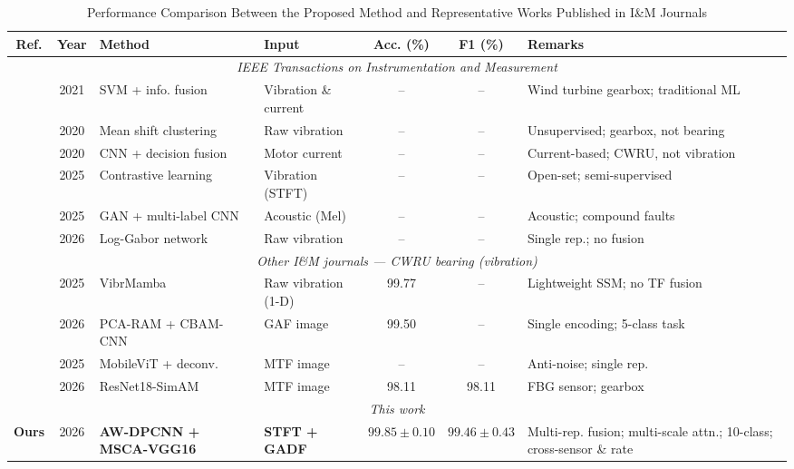 \begin{table}[!t]
\caption{Performance Comparison Between the Proposed Method and Representative Works Published in I\&M Journals\label{tab:previous_works}}
\centering
\renewcommand{\arraystretch}{1.15}
\footnotesize
\setlength{\tabcolsep}{3.5pt}
\begin{tabular}{c c l l c c p{3.8cm}}
\toprule
\textbf{Ref.} & \textbf{Year} & \textbf{Method} & \textbf{Input} & \textbf{Acc. (\%)} & \textbf{F1 (\%)} & \textbf{Remarks} \\
\midrule
\multicolumn{7}{c}{\textit{IEEE Transactions on Instrumentation and Measurement}} \\
\midrule
\cite{9440949}  & 2021 & SVM + info. fusion      & Vibration \& current & --   & --   & Wind turbine gearbox; traditional ML \\
\cite{8853278}  & 2020 & Mean shift clustering   & Raw vibration        & --   & --   & Unsupervised; gearbox, not bearing \\
\cite{8788665}  & 2020 & CNN + decision fusion   & Motor current        & --   & --   & Current-based; CWRU, not vibration \\
\cite{11028059} & 2025 & Contrastive learning    & Vibration (STFT)     & --   & --   & Open-set; semi-supervised \\
\cite{10929672} & 2025 & GAN + multi-label CNN   & Acoustic (Mel)       & --   & --   & Acoustic; compound faults \\
\cite{11345448} & 2026 & Log-Gabor network       & Raw vibration        & --   & --   & Single rep.; no fusion \\
\midrule
\multicolumn{7}{c}{\textit{Other I\&M journals --- CWRU bearing (vibration)}} \\
\midrule
\cite{YI2025116881}    & 2025 & VibrMamba              & Raw vibration (1-D)  & 99.77 & --   & Lightweight SSM; no TF fusion \\
\cite{ZHANG2026106301} & 2026 & PCA-RAM + CBAM-CNN      & GAF image            & 99.50 & --   & Single encoding; 5-class task \\
\cite{10663388}        & 2025 & MobileViT + deconv.     & MTF image            & --    & --   & Anti-noise; single rep. \\
\cite{DUAN2026122469}  & 2026 & ResNet18-SimAM          & MTF image            & 98.11 & 98.11& FBG sensor; gearbox \\
\midrule
\multicolumn{7}{c}{\textit{This work}} \\
\midrule
\textbf{Ours} & 2026 & \textbf{AW-DPCNN + MSCA-VGG16} & \textbf{STFT + GADF} & $\mathbf{99.85 \pm 0.10}$ & $\mathbf{99.46 \pm 0.43}$ & Multi-rep. fusion; multi-scale attn.; 10-class; cross-sensor \& rate \\
\bottomrule
\end{tabular}
\end{table}
